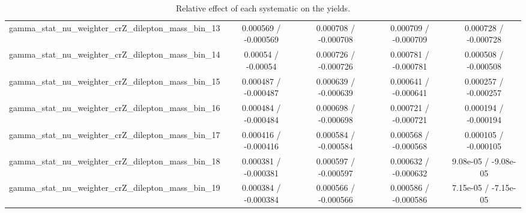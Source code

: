 \documentclass[10pt]{article}
\begin{document}
\begin{table}[htbp]
\begin{center}
\begin{tabular}{|c|c|c|c|c|}
  gamma_stat_nu_weighter_crZ_dilepton_mass_bin_13 & 0.000569 / -0.000569 & 0.000708 / -0.000708 & 0.000709 / -0.000709 & 0.000728 / -0.000728 \\ 
  gamma_stat_nu_weighter_crZ_dilepton_mass_bin_14 & 0.00054 / -0.00054 & 0.000726 / -0.000726 & 0.000781 / -0.000781 & 0.000508 / -0.000508 \\ 
  gamma_stat_nu_weighter_crZ_dilepton_mass_bin_15 & 0.000487 / -0.000487 & 0.000639 / -0.000639 & 0.000641 / -0.000641 & 0.000257 / -0.000257 \\ 
  gamma_stat_nu_weighter_crZ_dilepton_mass_bin_16 & 0.000484 / -0.000484 & 0.000698 / -0.000698 & 0.000721 / -0.000721 & 0.000194 / -0.000194 \\ 
  gamma_stat_nu_weighter_crZ_dilepton_mass_bin_17 & 0.000416 / -0.000416 & 0.000584 / -0.000584 & 0.000568 / -0.000568 & 0.000105 / -0.000105 \\ 
  gamma_stat_nu_weighter_crZ_dilepton_mass_bin_18 & 0.000381 / -0.000381 & 0.000597 / -0.000597 & 0.000632 / -0.000632 & 9.08e-05 / -9.08e-05 \\ 
  gamma_stat_nu_weighter_crZ_dilepton_mass_bin_19 & 0.000384 / -0.000384 & 0.000566 / -0.000566 & 0.000586 / -0.000586 & 7.15e-05 / -7.15e-05 \\ 
\hline 
\end{tabular} 
\caption{Relative effect of each systematic on the yields.} 
\end{center} 
\end{table} 
\end{document}
